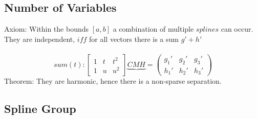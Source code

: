 \documentclass{report}
\begin{document}
\subsection{Number of Variables}
Axiom: Within the bounds $[a,b]$ a combination of multiple $splines$ can occur. They are independent, $iff$ for all vectors there is a sum $g' +h'$\\\\
\begin{equation}
sum(t):
\begin{bmatrix}
1 & t & t^2\\
1 & u & u^2
\end{bmatrix}
\underbrace{CMH}_{}
=
\begin{pmatrix}
g_{1}' & g_{2}' & g_{3}'\\
h_{1}' & h_{2}' & h_{3}'
\end{pmatrix}
\end{equation}
Theorem: They are harmonic, hence there is a non-sparse separation.

\subsection{Spline Group}
\end{document}
